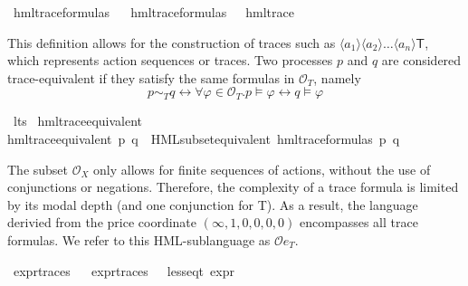 \begin{isabellebody}
\isanewline
{}\isamarkupfalse%
\ hml{\isacharunderscore}{\kern0pt}trace{\isacharunderscore}{\kern0pt}formulas\isanewline
\ \ \isanewline
{\isachardoublequoteopen}hml{\isacharunderscore}{\kern0pt}trace{\isacharunderscore}{\kern0pt}formulas\ {\isasymequiv}\ {\isacharbraceleft}{\kern0pt}{\isasymphi}{\isachardot}{\kern0pt}\ hml{\isacharunderscore}{\kern0pt}trace\ {\isasymphi}{\isacharbraceright}{\kern0pt}{\isachardoublequoteclose}%
\begin{isamarkuptext}%
This definition allows for the construction of traces such as $\langle a_1 \rangle \langle a_2 \rangle \ldots \langle a_n \rangle \textsf{T}$, which represents action sequences or traces.
Two processes $p$ and $q$ are considered trace-equivalent if they satisfy the same formulas in $\mathcal{O}_T$, namely 
$$p \sim_T q \longleftrightarrow \forall\varphi\in\mathcal{O}_T. p\models\varphi \longleftrightarrow q\models\varphi$$%
\end{isamarkuptext}\isamarkuptrue%
\isamarkupfalse%
\ lts\isanewline
{}\isanewline
\isanewline
{}\isamarkupfalse%
\ hml{\isacharunderscore}{\kern0pt}trace{\isacharunderscore}{\kern0pt}equivalent\ \isanewline
{\isachardoublequoteopen}hml{\isacharunderscore}{\kern0pt}trace{\isacharunderscore}{\kern0pt}equivalent\ p\ q\ {\isasymequiv}\ HML{\isacharunderscore}{\kern0pt}subset{\isacharunderscore}{\kern0pt}equivalent\ hml{\isacharunderscore}{\kern0pt}trace{\isacharunderscore}{\kern0pt}formulas\ p\ q{\isachardoublequoteclose}%
\begin{isamarkuptext}%
The subset $\mathcal{O}_X$ only allows for finite sequences of actions, without the use of conjunctions or negations. 
Therefore, the complexity of a trace formula is limited by its modal depth (and one conjunction for \textsf{T}). 
As a result, the language derivied from the price coordinate $(\infty, 1, 0, 0, 0, 0)$ encompasses all trace formulas. 
We refer to this HML-sublanguage as $\mathcal{O}{e_T}$.%
\end{isamarkuptext}\isamarkuptrue%
\isamarkupfalse%
\ expr{\isacharunderscore}{\kern0pt}traces\isanewline
\ \ \isanewline
{\isachardoublequoteopen}expr{\isacharunderscore}{\kern0pt}traces\ {\isacharequal}{\kern0pt}\ {\isacharbraceleft}{\kern0pt}{\isasymphi}{\isachardot}{\kern0pt}\ {\isacharparenleft}{\kern0pt}less{\isacharunderscore}{\kern0pt}eq{\isacharunderscore}{\kern0pt}t\ {\isacharparenleft}{\kern0pt}expr\ {\isasymphi}{\isacharparenright}{\kern0pt}\ {\isacharparenleft}{\kern0pt}{\isasyminfinity}{\isacharcomma}{\kern0pt}\ {}{\isacharcomma}{\kern0pt}\ {}{\isacharcomma}{\kern0pt}\ {}{\isacharcomma}{\kern0pt}\ {}{\isacharcomma}{\kern0pt}\ {}{\isacharparenright}{\kern0pt}{\isacharparenright}{\kern0pt}{\isacharbraceright}{\kern0pt}{\isachardoublequoteclose}\isanewline

\end{isabellebody}
